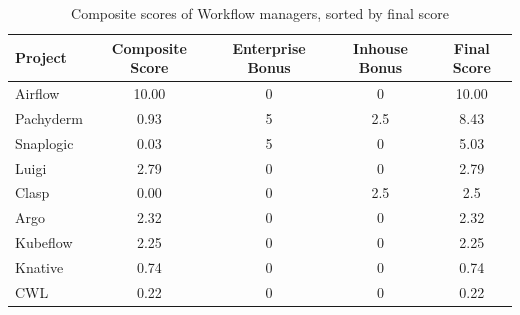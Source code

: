 \begin{table}[h!]
    \centering
    \begin{tabular}{|l|c|c|c|c|} 
    \hline
        \textbf{Project} & \textbf{Composite Score} & \textbf{Enterprise Bonus} & \textbf{Inhouse Bonus}  & \textbf{Final Score}\\
        \hline
        Airflow & 10.00 & 0 & 0 & 10.00 \\
        Pachyderm & 0.93 & 5 & 2.5 & 8.43 \\
        Snaplogic & 0.03 & 5 & 0 & 5.03 \\
        Luigi & 2.79 & 0 & 0 & 2.79 \\
        Clasp & 0.00 & 0 & 2.5 & 2.5 \\
        Argo & 2.32 & 0 & 0 & 2.32 \\
        Kubeflow & 2.25 & 0 & 0 & 2.25 \\
        Knative & 0.74 & 0 & 0 & 0.74 \\
        CWL & 0.22 & 0 & 0 & 0.22 \\
    \hline
    \end{tabular}
    \caption{Composite scores of Workflow managers, sorted by final score}
    \label{tab:results}
\end{table}



